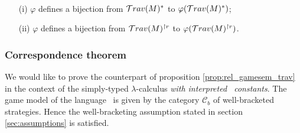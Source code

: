 \begin{cor} \
\label{cor:SIGMACONST:varphi_bij}
\begin{itemize}
\item[(i)] $\varphi$ defines a bijection from $\mathcal{T}rav(M)^*$
to $\varphi(\mathcal{T}rav(M)^*)$;
\item[(ii)] $\varphi$ defines a bijection from $\mathcal{T}rav(M)^{\upharpoonright r}$ to
$\varphi(\mathcal{T}rav(M)^{\upharpoonright r})$.
\end{itemize}
\end{cor}


\subsubsection{Correspondence theorem}
We would like to prove the counterpart of proposition
\ref{prop:rel_gamesem_trav} in the context of the simply-typed
$\lambda$-calculus \emph{with interpreted \pcf\ constants}. The game
model of the language \pcf\ is given by the category $\mathcal{C}_b$
of well-bracketed strategies. Hence the well-bracketing assumption
stated in section \ref{sec:assumptions} is satisfied.

